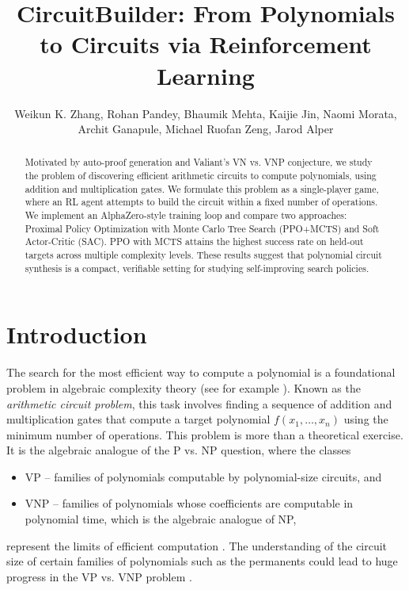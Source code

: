 \documentclass{article} %
\title{CircuitBuilder: From Polynomials to Circuits via Reinforcement Learning}
\author{Weikun K. Zhang, Rohan Pandey, Bhaumik Mehta, Kaijie Jin, Naomi Morata, Archit Ganapule, Michael Ruofan Zeng, Jarod Alper 
}
\begin{document}
\maketitle

\begin{abstract}
Motivated by auto-proof generation and Valiant's VN vs. VNP conjecture, we study the problem of discovering efficient arithmetic circuits to compute polynomials, using addition and multiplication gates. We formulate this problem as a single-player game, where an RL agent attempts to build the circuit within a fixed number of operations. We implement an AlphaZero-style training loop and compare two approaches: Proximal Policy Optimization with Monte Carlo Tree Search (PPO+MCTS) and Soft Actor-Critic (SAC). PPO with MCTS attains the highest success rate on held-out targets across multiple complexity levels. These results suggest that polynomial circuit synthesis is a compact, verifiable setting for studying self-improving search policies. 
\end{abstract}



\section{Introduction}

The search for the most efficient way to compute a polynomial is a foundational problem in algebraic complexity theory (see for example \citet{Burgisser1997AlgebraicComplexity, ShpilkaYehudayoff2009Circuits}). Known as the \textit{arithmetic circuit problem}, this task involves finding a sequence of addition and multiplication gates that compute a target polynomial $f(x_{1}, \dots, x_{n})$ using the minimum number of operations. This problem is more than a theoretical exercise. It is the algebraic analogue of the P vs. NP question, where the classes 
\begin{itemize}
    \item VP -- families of polynomials computable by polynomial-size circuits, and
    \item VNP -- families of polynomials whose coefficients are computable in polynomial time, which is the algebraic analogue of NP,
\end{itemize} represent the limits of efficient computation \citep{Valiant1979CompletenessClasses}. The understanding of the circuit size of certain families of polynomials such as the permanents could lead to huge progress in the VP vs. VNP problem \cite{Valiant1979Permanent}.
\end{document}
